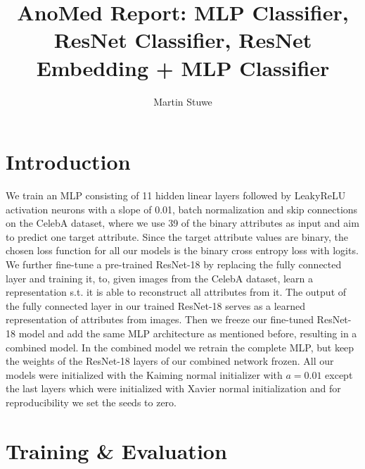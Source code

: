 \documentclass{article}
\author{Martin Stuwe}
\title{AnoMed Report: MLP Classifier, ResNet Classifier, ResNet Embedding + MLP Classifier}
\begin{document}
\maketitle
\section{Introduction}
We train an MLP consisting of 11 hidden linear layers followed by LeakyReLU activation neurons with a slope of 0.01, batch normalization and skip connections on the CelebA dataset,
where we use 39 of the binary attributes as input and aim to predict one target attribute.
Since the target attribute values are binary, the chosen loss function for all our models is the binary cross entropy loss with logits.
We further fine-tune a pre-trained ResNet-18 by replacing the fully connected layer and training it, to, given images from the CelebA dataset, learn a representation s.t. it is able to reconstruct all attributes from it.
The output of the fully connected layer in our trained ResNet-18 serves as a learned representation of attributes from images.
Then we freeze our fine-tuned ResNet-18 model and add the same MLP architecture as mentioned before,
resulting in a combined model.
In the combined model we retrain the complete MLP, but keep the weights of the ResNet-18 layers of our combined network frozen.
All our models were initialized with the Kaiming normal initializer with $a=0.01$ except the last layers which were initialized with Xavier normal initialization and for reproducibility we set the seeds to zero.
\begin{comment}
\section{Training}
We train a Multilayer Perceptron (MLP) to classify CelebA attributes.
Further we train a Residual Network (ResNet) which gets as input data, Celeb-A images of celebrity faces.
This ResNet targets to learn all Celeb-A attributes.

After training the ResNet we freeze it and use its latents i.e. the output of the last hidden layer as a representation.
The latents are fed to our pre-trained MLP
\end{comment}

\section{Training \& Evaluation}
\end{document}
